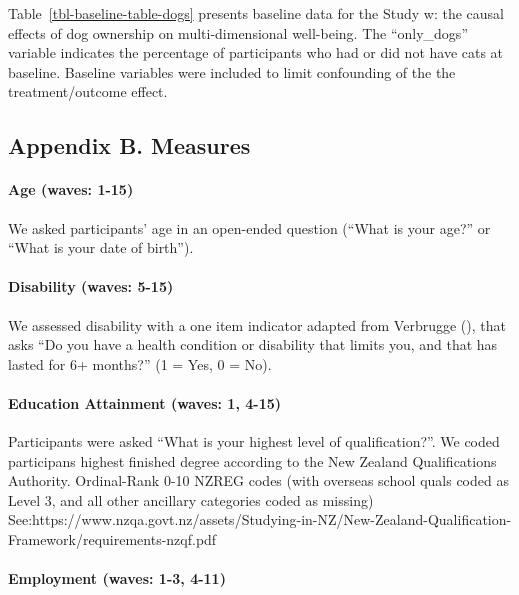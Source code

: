 \documentclass[
  singlecolumn,
  9pt]{article}
\let\oldparagraph\paragraph
\renewcommand{\paragraph}[1]{\oldparagraph{#1}\mbox{}}
\begin{document}
Table~\ref{tbl-baseline-table-dogs} presents baseline data for the Study
w: the causal effects of dog ownership on multi-dimensional well-being.
The ``only\_dogs'' variable indicates the percentage of participants who
had or did not have cats at baseline. Baseline variables were included
to limit confounding of the the treatment/outcome effect.

\subsection{Appendix B. Measures}\label{appendix-b.-measures}

\paragraph{Age (waves: 1-15)}\label{age-waves-1-15}

We asked participants' age in an open-ended question (``What is your
age?'' or ``What is your date of birth'').

\paragraph{Disability (waves: 5-15)}\label{disability-waves-5-15}

We assessed disability with a one item indicator adapted from Verbrugge
(), that asks ``Do you have a health
condition or disability that limits you, and that has lasted for 6+
months?'' (1 = Yes, 0 = No).

\paragraph{Education Attainment (waves: 1,
4-15)}\label{education-attainment-waves-1-4-15}

Participants were asked ``What is your highest level of
qualification?''. We coded participans highest finished degree according
to the New Zealand Qualifications Authority. Ordinal-Rank 0-10 NZREG
codes (with overseas school quals coded as Level 3, and all other
ancillary categories coded as missing)
See:https://www.nzqa.govt.nz/assets/Studying-in-NZ/New-Zealand-Qualification-Framework/requirements-nzqf.pdf

\paragraph{Employment (waves: 1-3,
4-11)}\label{employment-waves-1-3-4-11}
\end{document}
